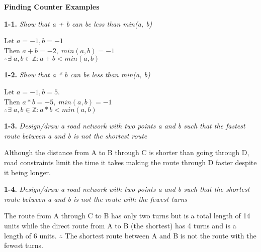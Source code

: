 \textbf{Finding Counter Examples}

\textbf{1-1.} \emph{Show that a + b can be less than min(a, b)}
  \begin{center}
  Let $a = -1, b = -1$ \\ 
  Then $a + b = -2, \; min(a,b) = -1$ \\
  $\therefore \exists \; a, b \in \mathbb{Z} : a+b < min(a,b)$
  \end{center}
  

\textbf{1-2.} \emph{Show that a * b can be less than min(a, b)}
  \begin{center}
  Let $a = -1, b = 5$. \\
  Then $a*b = -5, \; min(a,b) = -1$\\
  $\therefore \exists \; a, b \in \mathbb{Z} : a*b < min(a,b)$
  \end{center}

\textbf{1-3.} \emph{Design/draw a road network with two points a and b such that the fastest route between a and b is not the shortest route}
	\begin{center}
	\end{center}
Although the distance from A to B through C is shorter than going through D, road constraints limit the time it takes making the route through D faster despite it being longer.



\textbf{1-4.} \emph{Design/draw a road network with two points a and b such that the shortest route between a and b is not the route with the fewest turns}
	\begin{center}
	\end{center}
The route from A through C to B has only two turns but is a total length of 14 units while the direct route from A to B (the shortest) has 4 turns and is a length of 6 units. $\therefore$ The shortest route between A and B is not the route with the fewest turns.

